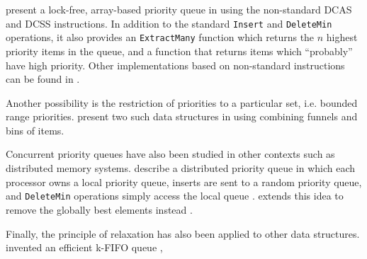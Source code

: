 \documentclass[a4paper,10pt]{article}
\begin{document}

\citeauthor{liu2012lock} present a lock-free, array-based priority queue in \cite{liu2012lock}
using the non-standard \ac{DCAS} and \ac{DCSS} instructions. In addition to the standard
\lstinline|Insert| and \lstinline|DeleteMin| operations, it also provides an \lstinline|ExtractMany|
function which returns the $n$ highest priority items in the queue, and a function that returns
items which ``probably'' have high priority. Other implementations based on non-standard instructions
can be found in \cite{israeli1993efficient,greenwald1999non}.


Another possibility is the restriction of priorities to a particular set, i.e. bounded range priorities.
\citeauthor{shavit1999scalable} present two such data structures in \cite{shavit1999scalable} using
combining funnels and bins of items.


Concurrent priority queues have also been studied in other contexts such as distributed memory systems.
\citeauthor{karp1993randomized} describe a distributed priority queue in which each processor owns
a local priority queue, inserts are sent to a random priority queue, and \lstinline|DeleteMin| operations
simply access the local queue \cite{karp1993randomized}.
\citeauthor{sanders1998randomized} extends this idea to remove the globally best elements instead
\cite{sanders1998randomized}.


Finally, the principle of relaxation has also been applied to other data structures.
\citeauthor{kirsch2012fast} invented an efficient k-FIFO queue \cite{kirsch2012fast},


\begin{comment}
  * hunt: most efficient old-school algorithm
  * lots of other older references in [4]
  * israeli, rappoport: wait-free, non-available atomic primitive
  * lotan, shavit [4]: skiplist, lock-based. first to propose usage of skip-lists [11]
  * sundell, tsigas [3]: skiplist, lock-free, linearizable, unique priorities
  * herlihy, shavit in art of multiprocessor programming: based on [4], lock-free.
  * linden, jonsson [11]: skiplist, lock-free, linearizable, reduced mem contention.
    first lock-free PQ algorithm [11, 12]
  * specialized versions such as
    * bounded priorities: [7] and others
    * probabilistic extractMin, extractMany: [9]
\end{comment}
\end{document}
